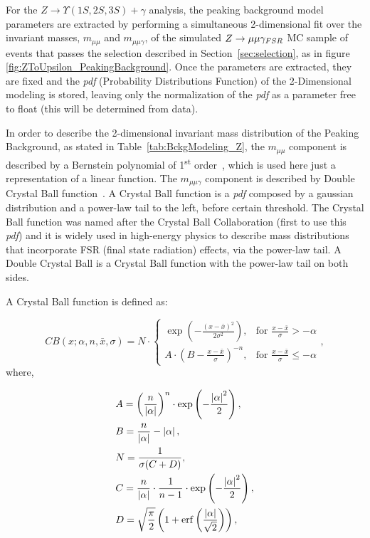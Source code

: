 For the $Z \rightarrow \Upsilon(1S,2S,3S) +\gamma$ analysis, the peaking background model parameters are extracted by performing a simultaneous 2-dimensional fit over the invariant masses, $m_{\mu\mu}$ and $m_{\mu\mu\gamma}$, of the simulated $Z \rightarrow \mu\mu\gamma_{\small{FSR}}$ MC sample of events that passes the selection described in Section~\ref{sec:selection}, as in figure \ref{fig:ZToUpsilon_PeakingBackground}. Once the parameters are extracted, they are fixed and the \textit{pdf} (Probability Distributions Function) of the 2-Dimensional modeling is stored, leaving only the normalization of the \textit{pdf} as a parameter free to float (this will be determined from data). 

In order to describe the 2-dimensional invariant mass distribution of the Peaking Background, as stated in Table~\ref{tab:BckgModeling_Z}, the $m_{\mu\mu}$ component is described by a Bernstein polynomial of 1\textsuperscript{st} order~\cite{Bernstein_pol}, which is used here just a representation of a linear function. The $m_{\mu\mu\gamma}$ component is described by Double Crystal Ball function~\cite{cb_function}. A Crystal Ball function is a \textit{pdf} composed by a gaussian distribution and a power-law tail to the left, before certain threshold. The Crystal Ball function was named after the Crystal Ball Collaboration (first to use this \textit{pdf}) and it is widely used in high-energy physics to describe mass distributions that incorporate FSR (final state radiation) effects, via the power-law tail. A Double Crystal Ball is a Crystal Ball function with the power-law tail on both sides.

A Crystal Ball function is defined as:


\begin{equation}
\label{eqn:cb_function}
CB(x;\alpha,n,\bar x,\sigma) = N \cdot \begin{cases} \exp(- \frac{(x - \bar x)^2}{2 \sigma^2}), & \mbox{for }\frac{x - \bar x}{\sigma} > -\alpha \\
 A \cdot (B - \frac{x - \bar x}{\sigma})^{-n}, & \mbox{for }\frac{x - \bar x}{\sigma} \leqslant -\alpha \end{cases},
\end{equation}
where,

\begin{equation}
    \begin{split}
        &A = \left(\frac{n}{\left| \alpha \right|}\right)^n \cdot \exp\left(- \frac {\left| \alpha \right|^2}{2}\right), \notag\\
        &B = \frac{n}{\left| \alpha \right|}  - \left| \alpha \right|, \notag\\
        &N = \frac{1}{\sigma (C + D)}, \notag\\
        &C = \frac{n}{\left| \alpha \right|} \cdot \frac{1}{n-1} \cdot \exp\left(- \frac {\left| \alpha \right|^2}{2}\right), \notag\\
        &D = \sqrt{\frac{\pi}{2}} \left(1 + \operatorname{erf}\left(\frac{\left| \alpha \right|}{\sqrt 2}\right)\right),
    \end{split}
\end{equation}

